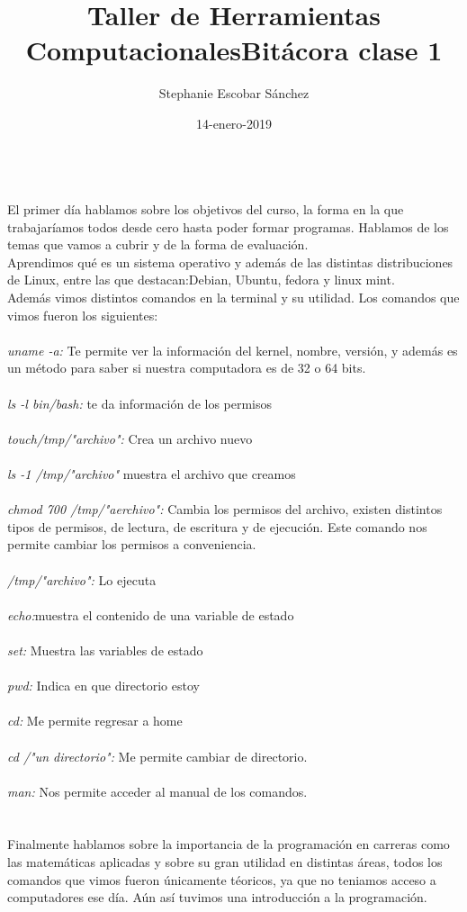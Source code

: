 \documentclass [letterpaper, 12 pts, oneside]{article}
\title{\Huge Taller de Herramientas Computacionales}
\author{Stephanie Escobar Sánchez}
\date{14-enero-2019}
\begin{document}
	\maketitle

	\newpage
	
	\title{\Huge Bitácora clase 1} \\
	
	El primer día hablamos sobre los objetivos del curso, la forma en la que trabajaríamos todos desde cero hasta poder formar programas. Hablamos de los temas que vamos a cubrir y de la forma de evaluación.\\
	Aprendimos qué es un sistema operativo y además de las distintas distribuciones de Linux, entre las que destacan:Debian, Ubuntu, fedora y linux mint.\\
	Además vimos distintos comandos en la terminal y su utilidad. Los comandos que vimos fueron los siguientes: \\
	\\
	\textit{uname -a:} Te permite ver la información del kernel, nombre, versión, y además es un método para saber si nuestra computadora es de 32 o 64 bits. \\
	\\
	\textit{ls -l bin/bash:} te da información de los permisos\\
	\\
	\textit{touch/tmp/"archivo":} Crea un archivo nuevo\\
	\\
	\textit{ls -1 /tmp/"archivo"}  muestra el archivo que creamos\\
	\\
	\textit{chmod 700 /tmp/"aerchivo":} Cambia los permisos del archivo, existen distintos tipos de permisos, de lectura, de escritura y de ejecución. Este comando nos permite cambiar los permisos a conveniencia. \\
	\\
	\textit{/tmp/"archivo":} Lo ejecuta\\
	\\
	\textit{echo:}muestra el contenido de una variable de estado\\
	\\
	\textit{set:} Muestra las variables de estado\\
	\\
	\textit{pwd:} Indica en que directorio estoy\\
	\\
	\textit{cd:} Me permite regresar a home\\
	\\
	\textit{cd /"un directorio":} Me permite cambiar de directorio.\\
	\\
	\textit{man:} Nos permite acceder al manual de los comandos.\\
	\\
	\\
	Finalmente hablamos sobre la importancia de la programación en carreras como las matemáticas aplicadas y sobre su gran utilidad en distintas áreas, todos los comandos que vimos fueron únicamente téoricos, ya que no teniamos acceso a computadores ese día. Aún así tuvimos una introducción a la programación.
		 
\end{document}
